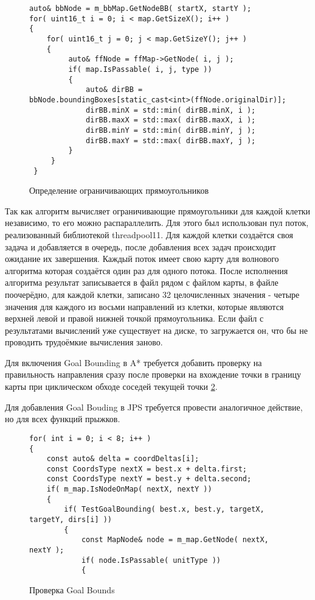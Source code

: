 \begin{figure}[!htb]
	\centering
	\captionsetup{justification=centering}
	\begin{lstlisting}
auto& bbNode = m_bbMap.GetNodeBB( startX, startY );
for( uint16_t i = 0; i < map.GetSizeX(); i++ )
{
	for( uint16_t j = 0; j < map.GetSizeY(); j++ )
	{
		 auto& ffNode = ffMap->GetNode( i, j ); 
		 if( map.IsPassable( i, j, type ))
		 {
			 auto& dirBB = bbNode.boundingBoxes[static_cast<int>(ffNode.originalDir)];	 
			 dirBB.minX = std::min( dirBB.minX, i );
			 dirBB.maxX = std::max( dirBB.maxX, i );
			 dirBB.minY = std::min( dirBB.minY, j );
			 dirBB.maxY = std::max( dirBB.maxY, j );
		 }
	 }
 }
	\end{lstlisting}
	\caption{Определение ограничивающих прямоугольников}
	\label{fig:goal_bounding_fill}
\end{figure}


Так как алгоритм вычисляет ограничивающие прямоугольники для каждой клетки независимо, то его можно распараллелить. Для этого был использован пул поток, реализованный библиотекой threadpool11. Для каждой клетки создаётся своя задача и добавляется в очередь, после добавления всех задач происходит ожидание их завершения. Каждый поток имеет свою карту для волнового алгоритма которая создаётся один раз для одного потока. После исполнения алгоритма результат записывается в файл рядом с файлом карты, в файле поочерёдно, для каждой клетки, записано 32 целочисленных значения - четыре значения для каждого из восьми направлений из клетки, которые являются верхней левой и правой нижней точкой прямоугольника. Если файл с результатами вычислений уже существует на диске, то загружается он, что бы не проводить трудоёмкие вычисления заново.

Для включения Goal Bounding в A* требуется добавить проверку на правильность направления сразу после проверки на вхождение точки в границу карты при циклическом обходе соседей текущей точки \cref{fig:a_star_test_goal_bounds}. 

Для добавления Goal Bouding в JPS требуется провести аналогичное действие, но для всех функций прыжков.

\begin{figure}[!htb]
	\centering
	\captionsetup{justification=centering}
	\begin{lstlisting}
for( int i = 0; i < 8; i++ )
{
	const auto& delta = coordDeltas[i];
	const CoordsType nextX = best.x + delta.first;
	const CoordsType nextY = best.y + delta.second;
	if( m_map.IsNodeOnMap( nextX, nextY ))
	{
		if( TestGoalBounding( best.x, best.y, targetX, targetY, dirs[i] ))
		{
			const MapNode& node = m_map.GetNode( nextX, nextY );
			if( node.IsPassable( unitType ))
			{
	\end{lstlisting}
	\caption{Проверка Goal Bounds}
	\label{fig:a_star_test_goal_bounds}
\end{figure}

